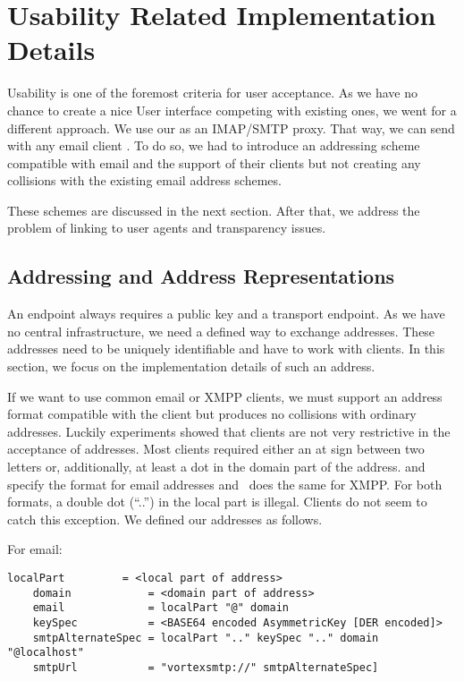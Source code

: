 \chapter{Usability Related Implementation Details}\label{sec:usabilityImplementation}
Usability is one of the foremost criteria for user acceptance. As we have no chance to create a nice User interface competing with existing ones, we went for a different approach. We use our \VortexNode{} as an IMAP/SMTP proxy. That way, we can send with any email client \VortexMessages. To do so, we had to introduce an addressing scheme compatible with email and the support of their clients but not creating any collisions with the existing email address schemes.

These schemes are discussed in the next section. After that, we address the problem of linking to user agents and transparency issues.

\section{Addressing and Address Representations}
An endpoint always requires a public key and a transport endpoint. As we have no central infrastructure, we need a defined way to exchange addresses. These addresses need to be uniquely identifiable and have to work with clients. In this section, we focus on the implementation details of such an address.

If we want to use common email or XMPP clients, we must support an address format compatible with the client but produces no collisions with ordinary addresses. Luckily experiments showed that clients are not very restrictive in the acceptance of addresses. Most clients required either an at sign between two letters or, additionally, at least a dot in the domain part of the address. \cite{rfc5321} and~\cite{rfc5322} specify the format for email addresses and~\cite{rfc6120} does the same for XMPP. For both formats, a double dot (``..'') in the local part is illegal. Clients do not seem to catch this exception. We defined our addresses as follows.


For email:
\begin{lstlisting}[language=EBNF]
	localPart         = <local part of address>
	domain            = <domain part of address>
	email             = localPart "@" domain
	keySpec           = <BASE64 encoded AsymmetricKey [DER encoded]>
	smtpAlternateSpec = localPart ".." keySpec ".." domain "@localhost"
	smtpUrl           = "vortexsmtp://" smtpAlternateSpec]
\end{lstlisting}

